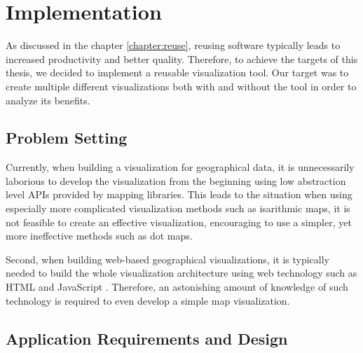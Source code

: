 
\chapter{Implementation}
\label{chapter:implementation}




As discussed in the chapter \ref{chapter:reuse}, reusing software typically leads to increased productivity and better quality. Therefore, to achieve the targets of this thesis, we decided to implement a reusable visualization tool. Our target was to create multiple different visualizations both with and without the tool in order to analyze its benefits.

\section{Problem Setting}

Currently, when building a visualization for geographical data, it is unnecessarily laborious to develop the visualization from the beginning using low abstraction level APIs provided by mapping libraries. This leads to the situation when using especially more complicated visualization methods such as isarithmic maps, it is not feasible to create an effective visualization, encouraging to use a simpler, yet more ineffective methods such as dot maps.

Second, when building web-based geographical visualizations, it is typically needed to build the whole visualization architecture using web technology such as HTML \citep{world_wide_web_consortium_html5_2014} and JavaScript \citep{ecma_ecmascript_2011}. Therefore, an astonishing amount of knowledge of such technology is required to even develop a simple map visualization. 


\section{Application Requirements and Design}
\label{section:requirements}

